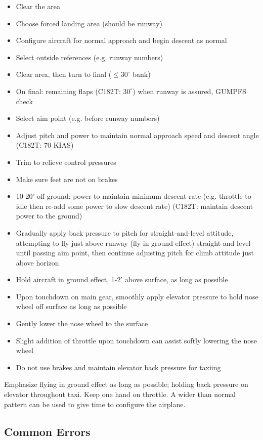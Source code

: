 \begin{itemize}
  \item Clear the area
  \item Choose forced landing area (should be runway)
  \item Configure aircraft for normal approach and begin descent as normal
  \item Select outside references (e.g. runway numbers)
  \item Clear area, then turn to final ($\leq 30^\circ$ bank)
  \item On final: remaining flaps (C182T: $30^\circ$) when runway is assured,
    GUMPFS check
  \item Select aim point (e.g. before runway numbers)
  \item Adjust pitch and power to maintain normal approach speed and descent
    angle (C182T: 70 KIAS)
  \item Trim to relieve control pressures
  \item Make sure feet are not on brakes
  \item 10-20' off ground: power to maintain minimum descent rate (e.g.
    throttle to idle then re-add some power to slow descent rate) (C182T:
    maintain descent power to the ground)
  \item Gradually apply back pressure to pitch for straight-and-level attitude,
    attempting to fly just above runway (fly in ground effect)
    straight-and-level until passing aim point, then continue adjusting pitch
    for climb attitude just above horizon
  \item Hold aircraft in ground effect, 1-2' above surface, as long as possible
  \item Upon touchdown on main gear, smoothly apply elevator pressure to hold
    nose wheel off surface as long as possible
  \item Gently lower the nose wheel to the surface
  \item Slight addition of throttle upon touchdown can assist softly lowering
    the nose wheel
  \item Do not use brakes and maintain elevator back pressure for taxiing
\end{itemize}

Emphasize flying in ground effect as long as possible; holding back pressure on
elevator throughout taxi. Keep one hand on throttle. A wider than normal
pattern can be used to give time to configure the airplane.

\subsection{Common Errors}

